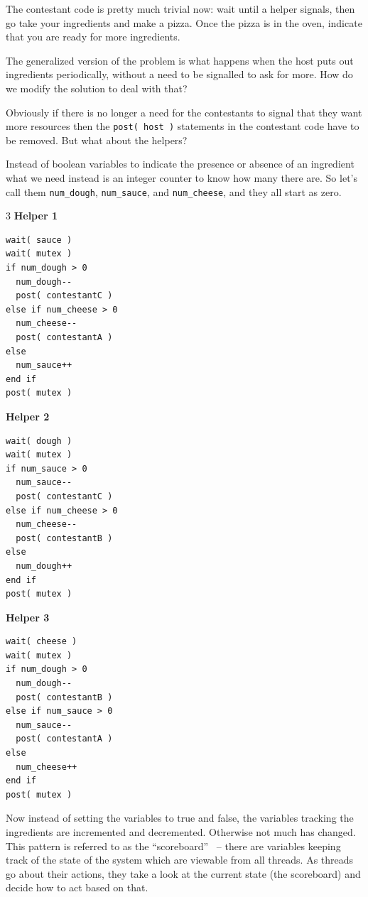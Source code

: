 The contestant code is pretty much trivial now: wait until a helper signals, then go take your ingredients and make a pizza. Once the pizza is in the oven, indicate that you are ready for more ingredients.

The generalized version of the problem is what happens when the host puts out ingredients periodically, without a need to be signalled to ask for more. How do we modify the solution to deal with that?

Obviously if there is no longer a need for the contestants to signal that they want more resources then the \texttt{post( host )} statements in the contestant code have to be removed. But what about the helpers?

Instead of boolean variables to indicate the presence or absence of an ingredient what we need instead is an integer counter to know how many there are. So let's call them \texttt{num\_dough}, \texttt{num\_sauce}, and \texttt{num\_cheese}, and they all start as zero.

\begin{multicols}{3}
	\textbf{Helper 1}
	\begin{lstlisting}
wait( sauce )
wait( mutex )
if num_dough > 0  
  num_dough--
  post( contestantC )
else if num_cheese > 0
  num_cheese--
  post( contestantA )
else
  num_sauce++
end if  
post( mutex )
\end{lstlisting}
	\columnbreak
	\textbf{Helper 2}
	\begin{lstlisting}
wait( dough )
wait( mutex )
if num_sauce > 0  
  num_sauce--
  post( contestantC )
else if num_cheese > 0
  num_cheese--
  post( contestantB )
else
  num_dough++
end if  
post( mutex )
\end{lstlisting}
	\columnbreak
	\textbf{Helper 3}
	\begin{lstlisting}
wait( cheese )
wait( mutex )
if num_dough > 0 
  num_dough--
  post( contestantB )
else if num_sauce > 0
  num_sauce--
  post( contestantA )
else
  num_cheese++
end if  
post( mutex )
\end{lstlisting}
\end{multicols}

Now instead of setting the variables to true and false, the variables tracking the ingredients are incremented and decremented. Otherwise not much has changed. This pattern is referred to as the ``scoreboard''~\cite{lbs} -- there are variables keeping track of the state of the system which are viewable from all threads. As threads go about their actions, they take a look at the current state (the scoreboard) and decide how to act based on that.

